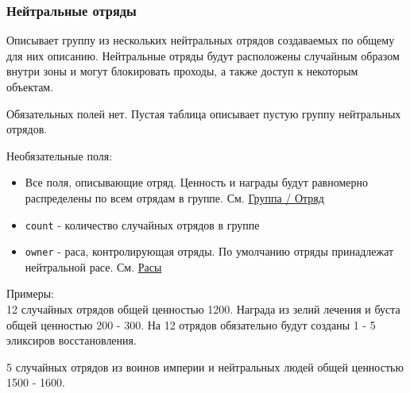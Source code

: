 \subsubsection{Нейтральные отряды}
\label{neutralStacks}
Описывает группу из нескольких нейтральных отрядов создаваемых по общему для них описанию.
Нейтральные отряды будут расположены случайным образом внутри зоны и могут блокировать проходы, а также доступ к некоторым объектам.

Обязательных полей нет. Пустая таблица описывает пустую группу нейтральных отрядов.

Необязательные поля:
\begin{itemize}
\item Все поля, описывающие отряд. Ценность и награды будут равномерно распределены по всем отрядам в группе. См. \hyperref[group]{Группа / Отряд}
\item \texttt{count} - количество случайных отрядов в группе
\item \texttt{owner} - раса, контролирующая отряды. По умолчанию отряды принадлежат нейтральной расе. См. \hyperref[raceTypes]{Расы}
\end{itemize}

Примеры:\\
12 случайных отрядов общей ценностью 1200.
Награда из зелий лечения и буста общей ценностью 200 - 300.
На 12 отрядов обязательно будут созданы  1 - 5 эликсиров восстановления.

\begin{figure}[H]

\end{figure}

5 случайных отрядов из воинов империи и нейтральных людей общей ценностью 1500 - 1600.

\begin{figure}[H]

\end{figure}